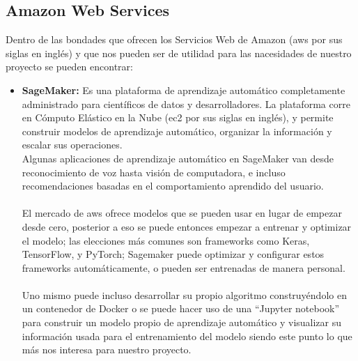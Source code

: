 \documentclass[12pt, a4paper, titlepage]{report}
\begin{document}
				\subsection{Amazon Web Services}
				Dentro de las bondades que ofrecen los Servicios Web de Amazon (\acrfull{aws} por sus siglas en ingl\'es) y que nos pueden ser de utilidad para las nacesidades de nuestro proyecto se pueden encontrar: 
				
				\begin{itemize}
					\item \textbf{SageMaker:} Es una plataforma de aprendizaje automático completamente administrado para científicos de datos y desarrolladores. La plataforma corre en Cómputo Elástico en la  Nube (\acrfull{ec2} por sus siglas en inglés), y permite construir modelos de aprendizaje automático, organizar la información y escalar sus operaciones. \\
					Algunas aplicaciones de aprendizaje automático en SageMaker van desde reconocimiento de voz hasta visión de computadora, e incluso recomendaciones basadas en el comportamiento aprendido del usuario.\\\\ 
					El mercado de \acrshort{aws} ofrece modelos que se pueden usar en lugar de empezar desde cero, posterior a eso se puede entonces empezar a entrenar y optimizar el modelo; las elecciones más comunes son frameworks como Keras, TensorFlow, y PyTorch; Sagemaker puede optimizar y configurar estos frameworks automáticamente, o pueden ser entrenadas de manera personal.\\\\ 
					\newpage
					Uno mismo puede incluso desarrollar su propio algoritmo construyéndolo en un contenedor de Docker o se puede hacer uso de una “Jupyter notebook” para construir un modelo propio de aprendizaje automático y visualizar su información usada para el entrenamiento del modelo siendo este punto lo que más nos interesa para nuestro proyecto.
					
				\end{itemize}
		
\end{document}
